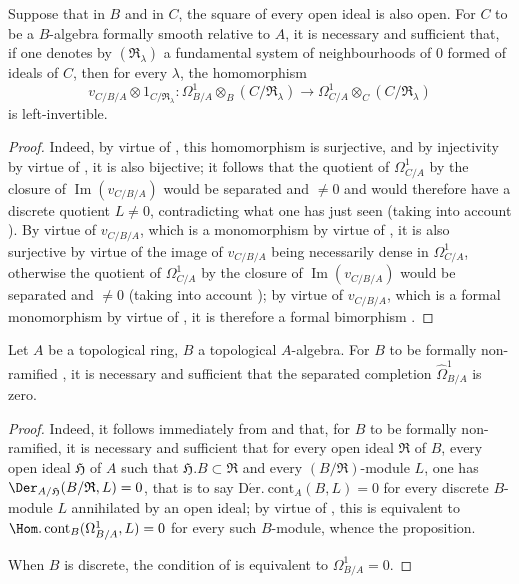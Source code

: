 \begin{corollary}[20.7.3]
\label{0.20.7.3}
Suppose that in $B$ and in $C$, the square of every open ideal is also open.
For $C$ to be a $B$-algebra formally smooth relative to $A$, it is necessary and sufficient that, if one denotes by $(\mathfrak{R}_\lambda)$ a fundamental system of neighbourhoods of $0$ formed of ideals of $C$, then for every $\lambda$, the homomorphism
\begin{equation}
\tag{20.7.3.1}
  \label{0.20.7.3.1}
  v_{C/B/A}\otimes 1_{C/\mathfrak{R}_\lambda}:\Omega^1_{B/A}\otimes_B(C/\mathfrak{R}_\lambda)\to\Omega^1_{C/A}\otimes_C(C/\mathfrak{R}_\lambda)
\end{equation}
is left-invertible.
\end{corollary}

\begin{proof}
Indeed, by virtue of , this homomorphism is surjective, and by injectivity by virtue of , it is also bijective; it follows that the quotient of $\Omega^1_{C/A}$ by the closure of $\operatorname{Im}(v_{C/B/A})$ would be separated and $\neq 0$ and would therefore have a discrete quotient $L\neq 0$, contradicting what one has just seen (taking into account ).
By virtue of $v_{C/B/A}$, which is a monomorphism by virtue of , it is also surjective by virtue of the image of $v_{C/B/A}$ being necessarily dense in $\Omega^1_{C/A}$, otherwise the quotient of $\Omega^1_{C/A}$ by the closure of $\operatorname{Im}(v_{C/B/A})$ would be separated and $\neq 0$ (taking into account ); by virtue of $v_{C/B/A}$, which is a formal monomorphism by virtue of , it is therefore a formal bimorphism .
\end{proof}

\begin{proposition}[20.7.4]
\label{0.20.7.4}
Let $A$ be a topological ring, $B$ a topological $A$-algebra.
For $B$ to be formally non-ramified , it is necessary and sufficient that the separated completion $\widehat{\Omega}^1_{B/A}$ is zero.
\end{proposition}

\begin{proof}
Indeed, it follows immediately from  and  that, for $B$ to be formally non-ramified, it is necessary and sufficient that for every open ideal $\mathfrak{R}$ of $B$, every open ideal $\mathfrak{H}$ of $A$ such that $\mathfrak{H}.B\subset\mathfrak{R}$ and every $(B/\mathfrak{R})$-module $L$, one has $\Der_{A/\mathfrak{H}}(B/\mathfrak{R},L)=0$, that is to say $\operatorname{D\acute{e}r.\ cont}_A(B,L)=0$ for every discrete $B$-module $L$ annihilated by an open ideal; by virtue of , this is equivalent to $\Hom.\operatorname{cont}_B(\Omega^1_{B/A},L)=0$ for every such $B$-module, whence the proposition.

When $B$ is discrete, the condition of  is equivalent to $\Omega^1_{B/A}=0$.
\end{proof}

